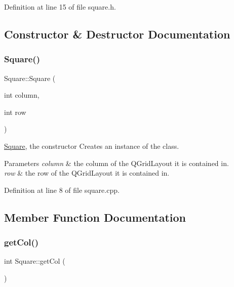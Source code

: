 Definition at line 15 of file square.\+h.



\subsection{Constructor \& Destructor Documentation}
\mbox{\label{class_square_a6fa43122d0022ee5553962b05bd8ecd4}} 
\subsubsection{\texorpdfstring{Square()}{Square()}}
{\footnotesize\ttfamily Square\+::\+Square (\begin{DoxyParamCaption}\item[{int}]{column,  }\item[{int}]{row }\end{DoxyParamCaption})}



\hyperlink{class_square}{Square}, the constructor Creates an instance of the class. 


\begin{DoxyParams}{Parameters}
{\em column} & the column of the Q\+Grid\+Layout it is contained in. \\
\hline
{\em row} & the row of the Q\+Grid\+Layout it is contained in. \\
\hline
\end{DoxyParams}


Definition at line 8 of file square.\+cpp.



\subsection{Member Function Documentation}
\mbox{\label{class_square_aaf011d4ff750d0770ba82b4c659c27f8}} 
\subsubsection{\texorpdfstring{get\+Col()}{getCol()}}
{\footnotesize\ttfamily int Square\+::get\+Col (\begin{DoxyParamCaption}{ }\end{DoxyParamCaption})\hspace{0.3cm}{\ttfamily [inline]}}




